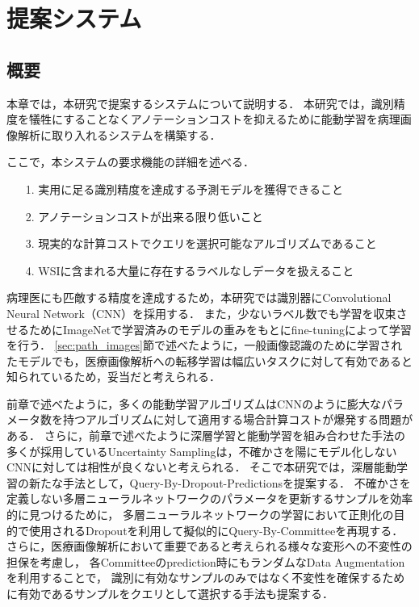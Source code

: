 \section{提案システム}

\subsection{概要}
本章では，本研究で提案するシステムについて説明する．
本研究では，識別精度を犠牲にすることなくアノテーションコストを抑えるために能動学習を病理画像解析に取り入れるシステムを構築する．

ここで，本システムの要求機能の詳細を述べる．
\begin{itemize}
    \item[1.] 実用に足る識別精度を達成する予測モデルを獲得できること
    \item[2.] アノテーションコストが出来る限り低いこと
    \item[3.] 現実的な計算コストでクエリを選択可能なアルゴリズムであること
    \item[4.] WSIに含まれる大量に存在するラベルなしデータを扱えること
\end{itemize}

病理医にも匹敵する精度を達成するため，本研究では識別器にConvolutional Neural Network（CNN）を採用する．
また，少ないラベル数でも学習を収束させるためにImageNetで学習済みのモデルの重みをもとにfine-tuningによって学習を行う．
\ref{sec:path_images}節で述べたように，一般画像認識のために学習されたモデルでも，医療画像解析への転移学習は幅広いタスクに対して有効であると知られているため，妥当だと考えられる．

前章で述べたように，多くの能動学習アルゴリズムはCNNのように膨大なパラメータ数を持つアルゴリズムに対して適用する場合計算コストが爆発する問題がある．
さらに，前章で述べたように深層学習と能動学習を組み合わせた手法の多くが採用しているUncertainty Samplingは，不確かさを陽にモデル化しないCNNに対しては相性が良くないと考えられる．
そこで本研究では，深層能動学習の新たな手法として，Query-By-Dropout-Predictionsを提案する．
不確かさを定義しない多層ニューラルネットワークのパラメータを更新するサンプルを効率的に見つけるために，
多層ニューラルネットワークの学習において正則化の目的で使用されるDropoutを利用して擬似的にQuery-By-Committeeを再現する．
さらに，医療画像解析において重要であると考えられる様々な変形への不変性の担保を考慮し，
各Committeeのprediction時にもランダムなData Augmentationを利用することで，
識別に有効なサンプルのみではなく不変性を確保するために有効であるサンプルをクエリとして選択する手法も提案する．

